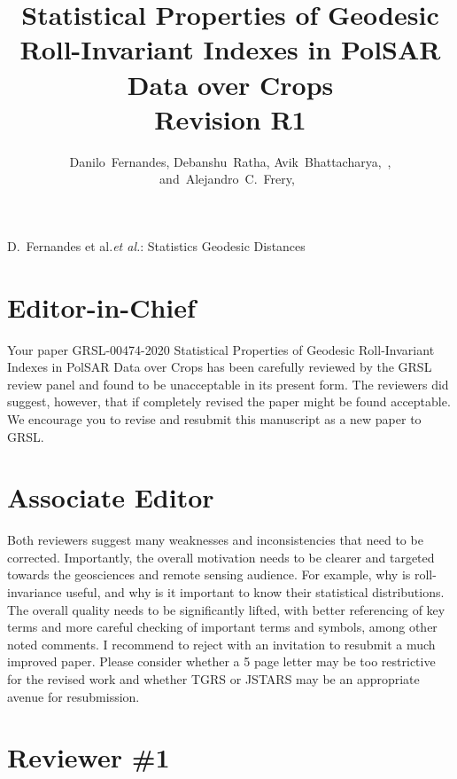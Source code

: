 \documentclass[journal,onecolumn,draftcls,11pt]{IEEEtran}
\begin{document}
\title{Statistical Properties of Geodesic Roll-Invariant Indexes in PolSAR Data over Crops\\
Revision R1}

\author{Danilo~Fernandes,
	Debanshu~Ratha,
	Avik~Bhattacharya,~,
	and~Alejandro~C.~Frery,~}

%
{D.\ Fernandes et al.\MakeLowercase{\textit{et al.}}: Statistics Geodesic Distances}

\maketitle

\IEEEpeerreviewmaketitle

\section{Editor-in-Chief}

Your paper GRSL-00474-2020 Statistical Properties of Geodesic Roll-Invariant Indexes in PolSAR Data over Crops has been carefully reviewed by the GRSL review panel and found to be unacceptable in its present form. The reviewers did suggest, however, that if completely revised the paper might be found acceptable. We encourage you to revise and resubmit this manuscript as a new paper to GRSL.


\section{Associate Editor}

Both reviewers suggest many weaknesses and inconsistencies that need to be corrected.
Importantly, the overall motivation needs to be clearer and targeted towards the geosciences and remote sensing audience. For example, why is roll-invariance useful, and why is it important to know their statistical distributions.
The overall quality needs to be significantly lifted, with better referencing of key terms and more careful checking of important terms and symbols, among other noted comments.
I recommend to reject with an invitation to resubmit a much improved paper. Please consider whether a 5 page letter may be too restrictive for the revised work and whether TGRS or JSTARS may be an appropriate avenue for resubmission.


\section{Reviewer \#1}
\end{document}
